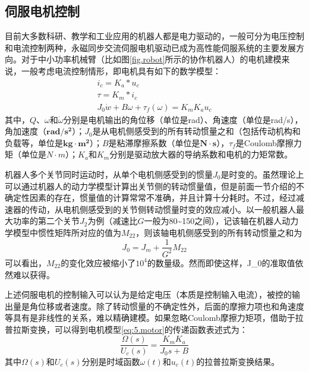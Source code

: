 \subsection{伺服电机控制}\label{chap:5.1.2}
目前大多数科研、教学和工业应用的机器人都是电力驱动的，一般可分为电压控制和电流控制两种，永磁同步交流伺服电机驱动已成为高性能伺服系统的主要发展方向。对于中小功率机械臂（比如图\ref{fig.robot}所示的协作机器人）的电机建模来说，一般考虑电流控制情形，即电机具有如下的数学模型：
\begin{equation}\label{eq:5.motor}
\begin{array}{c}
i_{c} = K_{a}*u_{c}\\
\tau = K_{m} * i_{c}\\
J_{0}\dot{w} + B \omega + \tau_{f}(\omega) = K_{m} K_{a} u_{c}
\end{array}
\end{equation}
其中，$Q$、$\omega$和$\dot{\omega}$分别是电机输出的角位移（单位是rad）、角速度（单位是rad/s），角加速度（$\mathbf{rad/s^{2}}$）；$J_{0}$是从电机侧感受到的所有转动惯量之和（包括传动机构和负载等，单位是$\mathbf{kg\cdot m^{2}}$）；$B$是粘滞摩擦系数（单位是$\mathbf{N\cdot s}$），$\tau_{f}$是Coulomb摩擦力矩（单位是$N\cdot m$）；$K_{a}$和$K_{m}$分别是驱动放大器的导纳系数和电机的力矩常数。

机器人多个关节同时运动时，从单个电机侧感受到的惯量$J_{0}$是时变的。虽然理论上可以通过机器人的动力学模型计算出关节侧的转动惯量值，但是前面一节介绍的不确定性因素的存在，惯量值的计算常常不准确，并且计算十分耗时。不过，经过减速器的传动，从电机侧感受到的关节侧转动惯量时变的效应减小。以一般机器人最大功率的第二个关节$J_{2}$为例（减速比$G$一般为80\~{}150之间），记该轴在机器人动力学模型中惯性矩阵所对应的值为$M_{22}$，则该轴电机侧感受到的所有转动惯量之和为
\begin{equation}\label{eq:5.J0}
J_{0} = J_{m} + \frac{1}{G^{2}}M_{22}
\end{equation}
可以看出，$M_{22}$的变化效应被缩小了$10^{4}$的数量级。然而即使这样，J_{0}的准取值依然难以获得。

上述伺服电机的控制输入可以认为是给定电压（本质是控制输入电流），被控的输出量是角位移或者速度。除了转动惯量的不确定性外，后面的摩擦力项也和角速度等具有是非线性的关系，难以精确建模。如果忽略Coulomb摩擦力矩项，借助于拉普拉斯变换，可以得到电机模型\eqref{eq:5.motor}的传递函数表述式为：
\begin{equation}\label{eq:5.trans}
\frac{\Omega(s)}{U_{c}(s)}=\frac{K_{m}K_{a}}{J_{0}s+B}
\end{equation}
其中$\Omega(s)$和$U_{c}(s)$分别是时域函数$\omega(t)$和$u_{c}(t)$的拉普拉斯变换结果。

